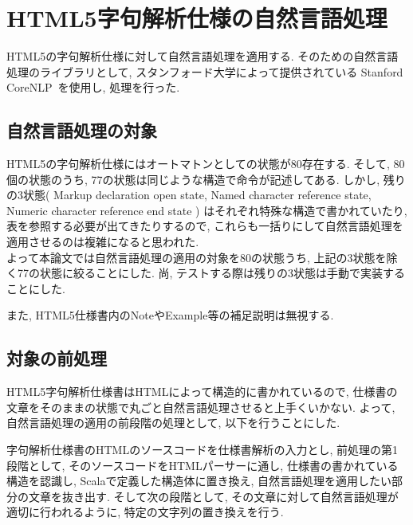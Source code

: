\documentclass[uplatex,a4j]{jsreport}
\begin{document}
\chapter{HTML5字句解析仕様の自然言語処理}
HTML5の字句解析仕様に対して自然言語処理を適用する. 
そのための自然言語処理のライブラリとして, スタンフォード大学によって提供されている Stanford CoreNLP~\cite{manning-EtAl:2014:P14-5}を使用し, 処理を行った.

\label{自然言語処理}
\section{自然言語処理の対象}
HTML5の字句解析仕様にはオートマトンとしての状態が80存在する. 
そして, 80個の状態のうち, 77の状態は同じような構造で命令が記述してある. 
しかし, 残りの3状態(
Markup declaration open state, 
Named character reference state, 
Numeric character reference end state
)
はそれぞれ特殊な構造で書かれていたり, 表を参照する必要が出てきたりするので, これらも一括りにして自然言語処理を適用させるのは複雑になると思われた. \\
よって本論文では自然言語処理の適用の対象を80の状態うち, 上記の3状態を除く77の状態に絞ることにした.
尚, テストする際は残りの3状態は手動で実装することにした. 

また, HTML5仕様書内のNoteやExample等の補足説明は無視する.

\section{対象の前処理}
HTML5字句解析仕様書はHTMLによって構造的に書かれているので, 仕様書の文章をそのままの状態で丸ごと自然言語処理させると上手くいかない.
よって, 自然言語処理の適用の前段階の処理として, 以下を行うことにした.

字句解析仕様書のHTMLのソースコードを仕様書解析の入力とし, 
前処理の第1段階として, そのソースコードをHTMLパーサーに通し, 仕様書の書かれている構造を認識し, Scalaで定義した構造体に置き換え, 自然言語処理を適用したい部分の文章を抜き出す. 
そして次の段階として, その文章に対して自然言語処理が適切に行われるように, 特定の文字列の置き換えを行う. 

\end{document}
